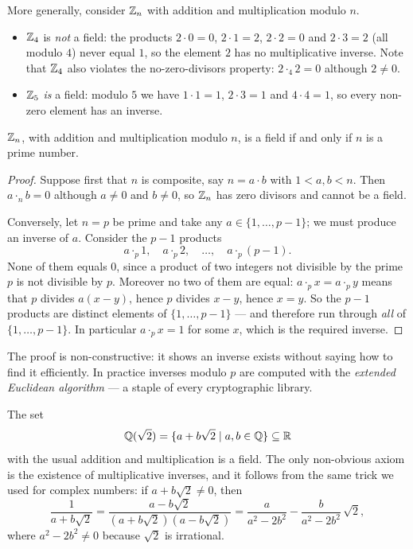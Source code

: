 \begin{example}
More generally, consider $\mathbb{Z}_n$ with addition and multiplication modulo $n$.
\begin{itemize}
\item $\mathbb{Z}_4$ is \emph{not} a field: the products $2\cdot 0 = 0$, $2\cdot 1 = 2$, $2\cdot 2 = 0$ and
$2\cdot 3 = 2$ (all modulo $4$) never equal $1$, so the element $2$ has no multiplicative inverse. Note
that $\mathbb{Z}_4$ also violates the no-zero-divisors property: $2\cdot_4 2 = 0$ although $2\neq 0$.
\item $\mathbb{Z}_5$ \emph{is} a field: modulo $5$ we have $1\cdot 1 = 1$, $2\cdot 3 = 1$ and $4\cdot 4 = 1$, so
every non-zero element has an inverse.
\end{itemize}
\end{example}

\begin{theorem}
$\mathbb{Z}_n$, with addition and multiplication modulo $n$, is a field if and only if $n$ is a prime number.
\end{theorem}

\begin{proof}
Suppose first that $n$ is composite, say $n = a\cdot b$ with $1<a,b<n$. Then $a\cdot_n b = 0$ although
$a\neq 0$ and $b\neq 0$, so $\mathbb{Z}_n$ has zero divisors and cannot be a field.

Conversely, let $n=p$ be prime and take any $a\in\{1,\ldots,p-1\}$; we must produce an inverse of $a$.
Consider the $p-1$ products
\[
a\cdot_p 1,\quad a\cdot_p 2,\quad \ldots,\quad a\cdot_p (p-1).
\]
None of them equals $0$, since a product of two integers not divisible by the prime $p$ is not divisible by
$p$. Moreover no two of them are equal: $a\cdot_p x = a\cdot_p y$ means that $p$ divides $a(x-y)$, hence
$p$ divides $x-y$, hence $x=y$. So the $p-1$ products are distinct elements of $\{1,\ldots,p-1\}$ — and
therefore run through \emph{all} of $\{1,\ldots,p-1\}$. In particular $a\cdot_p x = 1$ for some $x$, which
is the required inverse.
\end{proof}

\begin{remark}
The proof is non-constructive: it shows an inverse exists without saying how to find it efficiently. In
practice inverses modulo $p$ are computed with the \emph{extended Euclidean algorithm} — a staple of every
cryptographic library.
\end{remark}

\begin{example}
The set
\[
\mathbb{Q}(\sqrt 2) = \{a+b\sqrt 2\mid a,b\in \mathbb{Q}\}\subseteq \mathbb{R}
\]
with the usual addition and multiplication is a field. The only non-obvious axiom is the existence of
multiplicative inverses, and it follows from the same trick we used for complex numbers: if
$a+b\sqrt2\neq 0$, then
\[
\frac{1}{a+b\sqrt 2} = \frac{a-b\sqrt2}{(a+b\sqrt2)(a-b\sqrt2)}
= \frac{a}{a^2-2b^2}-\frac{b}{a^2-2b^2}\,\sqrt 2,
\]
where $a^2-2b^2\neq 0$ because $\sqrt2$ is irrational.
\end{example}

